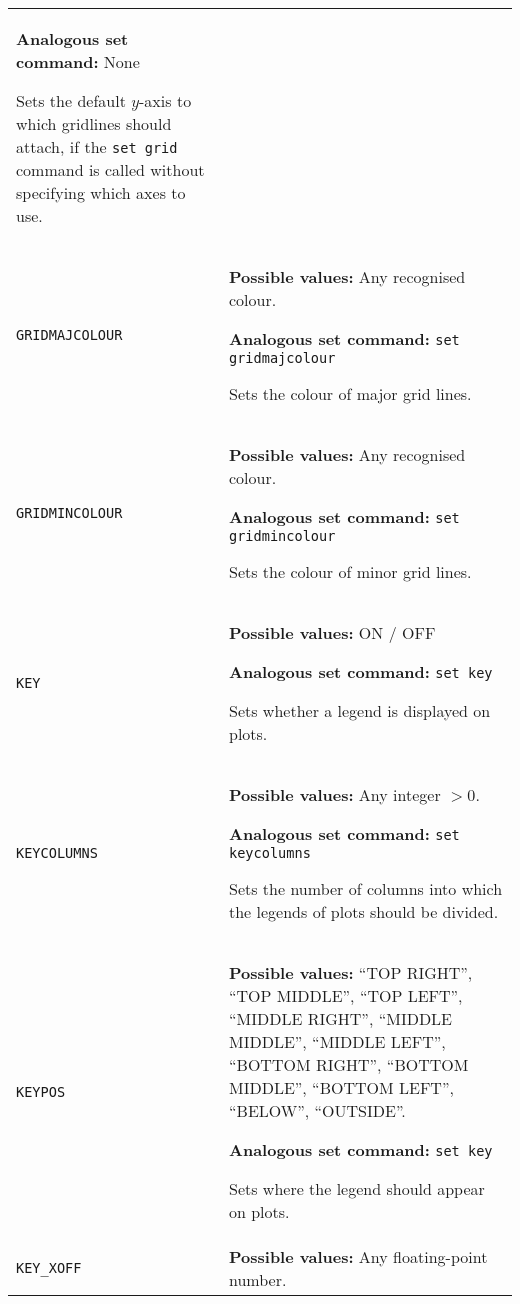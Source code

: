 \begin{longtable}{p{3.4cm}p{9cm}}
                   \textbf{Analogous set command:} None

                   Sets the default $y$-axis to which gridlines should attach, if the \texttt{set grid} command is called without specifying which axes to use.
                   \\
\texttt{GRIDMAJCOLOUR} & \textbf{Possible values:} Any recognised colour.

                   \textbf{Analogous set command:} \texttt{set gridmajcolour}\index{set gridmajcolour command@\texttt{set gridmajcolour} command}

                   Sets the colour of major grid lines.
                   \\
\texttt{GRIDMINCOLOUR} & \textbf{Possible values:} Any recognised colour.

                   \textbf{Analogous set command:} \texttt{set gridmincolour}\index{set gridmincolour command@\texttt{set gridmincolour} command}

                   Sets the colour of minor grid lines.
                   \\
\texttt{KEY} & \textbf{Possible values:} ON / OFF

                   \textbf{Analogous set command:} \texttt{set key}\index{set key command@\texttt{set key} command}

                   Sets whether a legend is displayed on plots.
                   \\
\texttt{KEYCOLUMNS} & \textbf{Possible values:} Any integer $>0$.

                   \textbf{Analogous set command:} \texttt{set keycolumns}\index{set keycolumnscommand@\texttt{set keycolumns} command}

                   Sets the number of columns into which the legends of plots should be divided.
                   \\
\texttt{KEYPOS} & \textbf{Possible values:} ``TOP RIGHT'', ``TOP MIDDLE'', ``TOP LEFT'', ``MIDDLE RIGHT'', ``MIDDLE MIDDLE'', ``MIDDLE LEFT'', ``BOTTOM RIGHT'', ``BOTTOM MIDDLE'', ``BOTTOM LEFT'', ``BELOW'', ``OUTSIDE''.

                   \textbf{Analogous set command:} \texttt{set key}\index{set key command@\texttt{set key} command}

                   Sets where the legend should appear on plots.
                   \\
\texttt{KEY\_XOFF} & \textbf{Possible values:} Any floating-point number.


\end{longtable}
